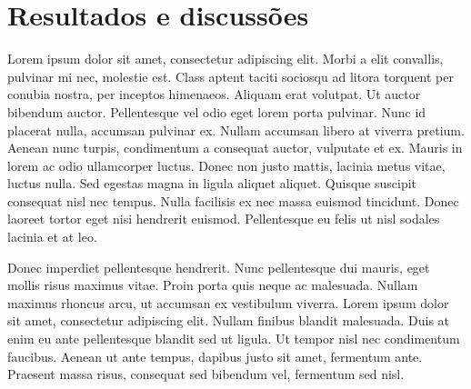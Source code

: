 \section{Resultados e discussões}
Lorem ipsum dolor sit amet, consectetur adipiscing elit. Morbi a elit convallis, pulvinar mi nec, molestie est. Class aptent taciti sociosqu ad litora torquent per conubia nostra, per inceptos himenaeos. Aliquam erat volutpat. Ut auctor bibendum auctor. Pellentesque vel odio eget lorem porta pulvinar. Nunc id placerat nulla, accumsan pulvinar ex. Nullam accumsan libero at viverra pretium. Aenean nunc turpis, condimentum a consequat auctor, vulputate et ex. Mauris in lorem ac odio ullamcorper luctus. Donec non justo mattis, lacinia metus vitae, luctus nulla. Sed egestas magna in ligula aliquet aliquet. Quisque suscipit consequat nisl nec tempus. Nulla facilisis ex nec massa euismod tincidunt. Donec laoreet tortor eget nisi hendrerit euismod. Pellentesque eu felis ut nisl sodales lacinia et at leo.

Donec imperdiet pellentesque hendrerit. Nunc pellentesque dui mauris, eget mollis risus maximus vitae. Proin porta quis neque ac malesuada. Nullam maximus rhoncus arcu, ut accumsan ex vestibulum viverra. Lorem ipsum dolor sit amet, consectetur adipiscing elit. Nullam finibus blandit malesuada. Duis at enim eu ante pellentesque blandit sed ut ligula. Ut tempor nisl nec condimentum faucibus. Aenean ut ante tempus, dapibus justo sit amet, fermentum ante. Praesent massa risus, consequat sed bibendum vel, fermentum sed nisl.